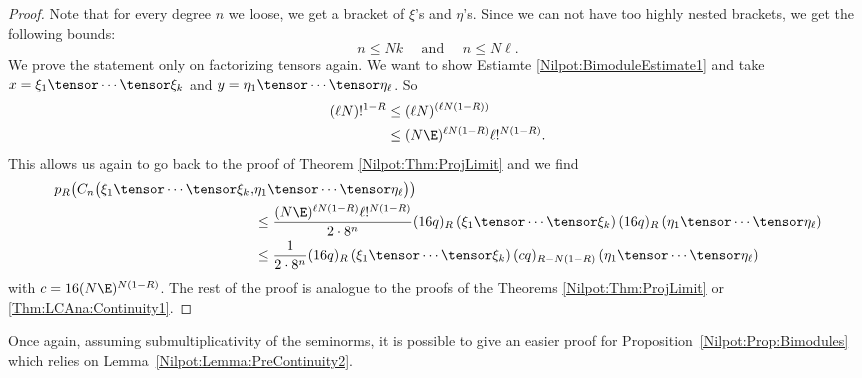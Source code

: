 \begin{proof}
	Note that for every degree $n$ we loose, we get a bracket of $\xi$'s and 
	$\eta$'s. Since we can not have too highly nested brackets, we get the 
	following bounds:
	\begin{equation*}
		n
		\leq
		N k
		\quad \text{ and } \quad
		n 
		\leq 
		N \ell.
	\end{equation*}
	We prove the statement only on factorizing tensors again. We 
	want to show Estiamte \eqref{Nilpot:BimoduleEstimate1} and take
	$x = \xi_1 \tensor \cdots \tensor \xi_k$ and $y = \eta_1 \tensor \cdots 
	\tensor \eta_\ell$. So
	\begin{align*}
		(\ell N)!^{1-R}
		& \leq
		(\ell N)^{(\ell N (1-R))}
		\\
		& \leq
		(N \E)^{\ell N (1- R)}
		\ell!^{N(1-R)}.
	\end{align*}
	This allows us again to go back to the proof of Theorem 
	\ref{Nilpot:Thm:ProjLimit} and we find
	\begin{align*}
		p_R \big(
			C_n \big(
				\xi_1 \tensor \cdots \tensor \xi_k,
		&
				\eta_1 \tensor \cdots \tensor \eta_\ell
			\big)
		\big)
		\\
		& \leq 
		\frac{ (N \E)^{\ell N (1- R)} \ell!^{N(1-R)} }
		{2 \cdot 8^n}
		(16 q)_R
		\left(
			\xi_1 \tensor \cdots \tensor \xi_k
		\right)
		(16 q)_R
		\left(
			\eta_1 \tensor \cdots \tensor \eta_\ell
		\right)
		\\
		& \leq
		\frac{1}{2 \cdot 8^n}
		(16 q)_R
		\left(
			\xi_1 \tensor \cdots \tensor \xi_k
		\right)
		(c q)_{R - N(1-R)}
		\left(
			\eta_1 \tensor \cdots \tensor \eta_\ell
		\right)
	\end{align*}
	with $c = 16 (N \E)^{N (1- R)}$. The rest of the proof is analogue to the 
	proofs of the Theorems \ref{Nilpot:Thm:ProjLimit} or
	 \ref{Thm:LCAna:Continuity1}.
\end{proof}
Once again, assuming submultiplicativity of the seminorms, it is possible to give 
an easier proof for Proposition~\ref{Nilpot:Prop:Bimodules} which relies on 
Lemma~\ref{Nilpot:Lemma:PreContinuity2}.
